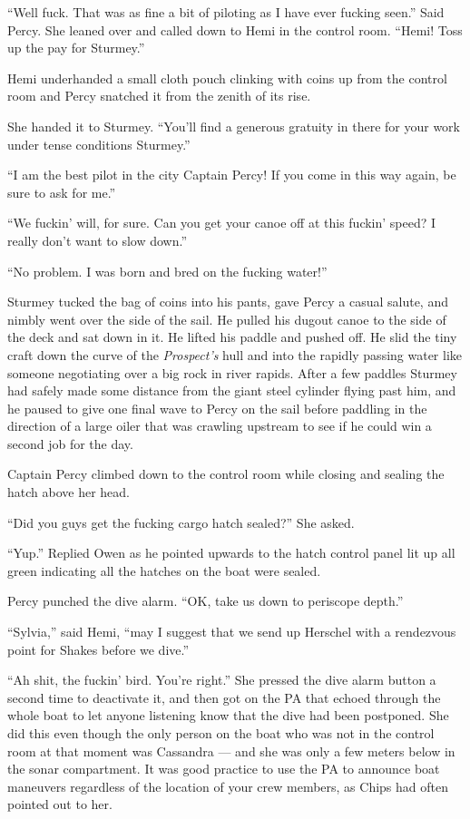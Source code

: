 \documentclass[]{scrbook}
\begin{document}
``Well fuck. That was as fine a bit of piloting as I have ever fucking
seen.'' Said Percy. She leaned over and called down to Hemi in the
control room. ``Hemi! Toss up the pay for Sturmey.''

Hemi underhanded a small cloth pouch clinking with coins up from the
control room and Percy snatched it from the zenith of its rise.

She handed it to Sturmey. ``You'll find a generous gratuity in there for
your work under tense conditions Sturmey.''

``I am the best pilot in the city Captain Percy! If you come in this way
again, be sure to ask for me.''

``We fuckin' will, for sure. Can you get your canoe off at this fuckin'
speed? I really don't want to slow down.''

``No problem. I was born and bred on the fucking water!''

Sturmey tucked the bag of coins into his pants, gave Percy a casual
salute, and nimbly went over the side of the sail. He pulled his dugout
canoe to the side of the deck and sat down in it. He lifted his paddle
and pushed off. He slid the tiny craft down the curve of the
\emph{Prospect's} hull and into the rapidly passing water like someone
negotiating over a big rock in river rapids. After a few paddles Sturmey
had safely made some distance from the giant steel cylinder flying past
him, and he paused to give one final wave to Percy on the sail before
paddling in the direction of a large oiler that was crawling upstream to
see if he could win a second job for the day.

Captain Percy climbed down to the control room while closing and sealing
the hatch above her head.

``Did you guys get the fucking cargo hatch sealed?'' She asked.

``Yup.'' Replied Owen as he pointed upwards to the hatch control panel
lit up all green indicating all the hatches on the boat were sealed.

Percy punched the dive alarm. ``OK, take us down to periscope depth.''

``Sylvia,'' said Hemi, ``may I suggest that we send up Herschel with a
rendezvous point for Shakes before we dive.''

``Ah shit, the fuckin' bird. You're right.'' She pressed the dive alarm
button a second time to deactivate it, and then got on the PA that
echoed through the whole boat to let anyone listening know that the dive
had been postponed. She did this even though the only person on the boat
who was not in the control room at that moment was Cassandra --- and she
was only a few meters below in the sonar compartment. It was good
practice to use the PA to announce boat maneuvers regardless of the
location of your crew members, as Chips had often pointed out to her.
\end{document}
